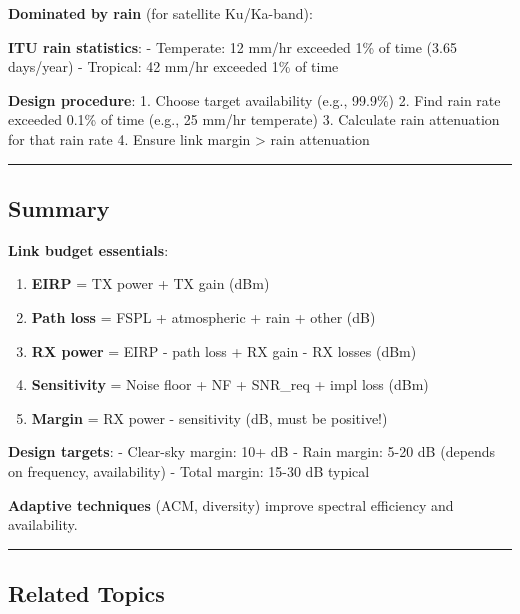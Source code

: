 \textbf{Dominated by rain} (for satellite Ku/Ka-band):

\textbf{ITU rain statistics}: - Temperate: 12 mm/hr exceeded 1\% of time
(3.65 days/year) - Tropical: 42 mm/hr exceeded 1\% of time

\textbf{Design procedure}: 1. Choose target availability (e.g., 99.9\%)
2. Find rain rate exceeded 0.1\% of time (e.g., 25 mm/hr temperate) 3.
Calculate rain attenuation for that rain rate 4. Ensure link margin
\textgreater{} rain attenuation

\begin{center}\rule{0.5\linewidth}{0.5pt}\end{center}

\subsection{Summary}\label{summary}

\textbf{Link budget essentials}:

\begin{enumerate}
\def\labelenumi{\arabic{enumi}.}
\tightlist
\item
  \textbf{EIRP} = TX power + TX gain (dBm)
\item
  \textbf{Path loss} = FSPL + atmospheric + rain + other (dB)
\item
  \textbf{RX power} = EIRP - path loss + RX gain - RX losses (dBm)
\item
  \textbf{Sensitivity} = Noise floor + NF + SNR\_req + impl loss (dBm)
\item
  \textbf{Margin} = RX power - sensitivity (dB, must be positive!)
\end{enumerate}

\textbf{Design targets}: - Clear-sky margin: 10+ dB - Rain margin: 5-20
dB (depends on frequency, availability) - Total margin: 15-30 dB typical

\textbf{Adaptive techniques} (ACM, diversity) improve spectral
efficiency and availability.

\begin{center}\rule{0.5\linewidth}{0.5pt}\end{center}

\subsection{Related Topics}\label{related-topics}

